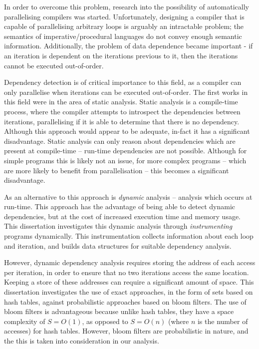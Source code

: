 In order to overcome this problem, research into the possibility of automatically parallelising compilers was started. Unfortunately, designing a compiler that is capable of parallelising arbitrary loops is arguably an intractable problem; the semantics of imperative/procedural languages do not convey enough semantic information. Additionally, the problem of data dependence became important - if an iteration is dependent on the iterations previous to it, then the iterations cannot be executed out-of-order.

Dependency detection is of critical importance to this field, as a compiler can only parallelise when iterations can be executed out-of-order. The first works in this field were in the area of static analysis. Static analysis is a compile-time process, where the compiler attempts to introspect the dependencies between iterations, parallelising if it is able to determine that there is no dependency. Although this approach would appear to be adequate, in-fact it has a significant disadvantage. Static analysis can only reason about dependencies which are present at compile-time -- run-time dependencies are not possible. Although for simple programs this is likely not an issue, for more complex programs -- which are more likely to benefit from parallelisation -- this becomes a significant disadvantage.

As an alternative to this approach is \textit{dynamic} analysis -- analysis which occurs at run-time. This approach has the advantage of being able to detect dynamic dependencies, but at the cost of increased execution time and memory usage. This dissertation investigates this dynamic analysis through \textit{instrumenting} programs dynamically. This instrumentation collects information about each loop and iteration, and builds data structures for suitable dependency analysis. 

However, dynamic dependency analysis requires storing the address of each access per iteration, in order to ensure that no two iterations access the same location. Keeping a store of these addresses can require a significant amount of space. This dissertation investigates the use of exact approaches, in the form of sets based on hash tables, against probabilistic approaches based on bloom filters. The use of bloom filters is advantageous because unlike hash tables, they have a space complexity of $S=O(1)$, as opposed to $S=O(n)$ (where $n$ is the number of accesses) for hash tables. However, bloom filters are probabilistic in nature, and the this is taken into consideration in our analysis.

